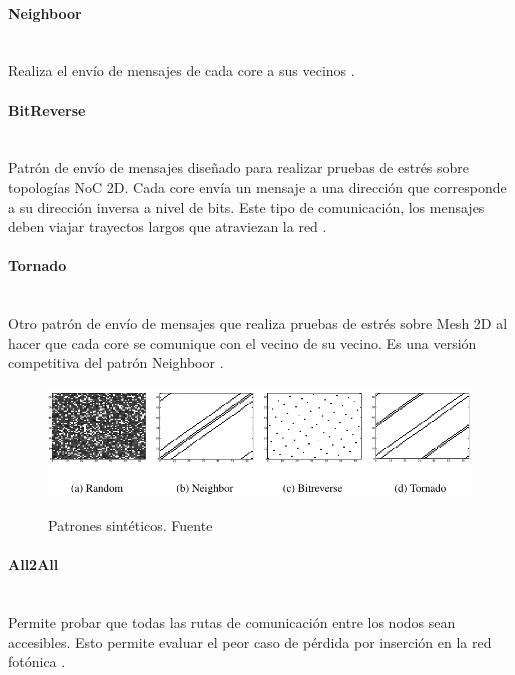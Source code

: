 \paragraph{Neighboor}~\\
Realiza el envío de mensajes de cada core a sus vecinos \cite{hendry2009analysis}.

\paragraph{BitReverse}~\\
Patrón de envío de mensajes diseñado para realizar pruebas de estrés sobre topologías NoC 2D.
Cada core envía un mensaje a una dirección que corresponde a su dirección inversa a nivel de
bits. Este tipo de comunicación, los mensajes deben viajar trayectos largos que atraviezan la 
red \cite{hendry2009analysis}.

\paragraph{Tornado} ~\\
Otro patrón de envío de mensajes que realiza pruebas de estrés sobre Mesh 2D al hacer que
cada core se comunique con el vecino de su vecino. Es una versión competitiva del patrón
Neighboor \cite{hendry2009analysis}.

\begin{figure}[H]
\caption{Patrones sintéticos. Fuente \cite{hendry2009analysis}}
\centering
\includegraphics[width=1.0\textwidth,natwidth=787,natheight=205]{figs/syntbench.png}
\label{fig:synthbench}
\end{figure} 

\paragraph{All2All}~\\ 
Permite probar que todas las rutas de comunicación entre los nodos sean accesibles. Esto permite evaluar el peor caso de pérdida por inserción en la red fotónica \cite{Manual}.

